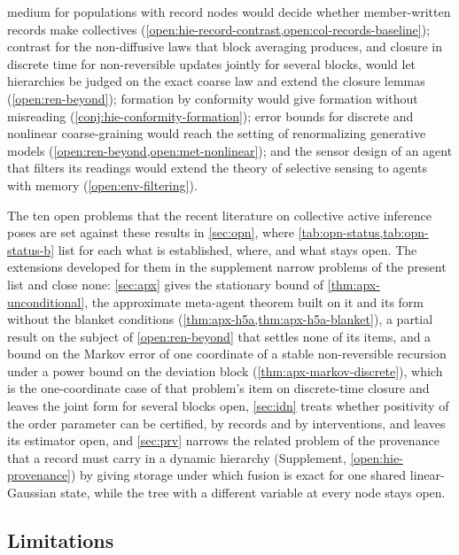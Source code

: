 medium for populations with record nodes would decide whether member-written records make collectives (\cref{open:hie-record-contrast,open:col-records-baseline}); contrast for the non-diffusive laws that block averaging produces, and closure in discrete time for non-reversible updates jointly for several blocks, would let hierarchies be judged on the exact coarse law and extend the closure lemmas (\cref{open:ren-beyond}); formation by conformity would give formation without misreading (\cref{conj:hie-conformity-formation}); error bounds for discrete and nonlinear coarse-graining would reach the setting of renormalizing generative models (\cref{open:ren-beyond,open:met-nonlinear}); and the sensor design of an agent that filters its readings would extend the theory of selective sensing to agents with memory (\cref{open:env-filtering}).

The ten open problems that the recent literature on collective active inference poses are set against these results in \cref{sec:opn}, where \cref{tab:opn-status,tab:opn-status-b} list for each what is established, where, and what stays open. The extensions developed for them in the supplement narrow problems of the present list and close none: \cref{sec:apx} gives the stationary bound of \cref{thm:apx-unconditional}, the approximate meta-agent theorem built on it and its form without the blanket conditions (\cref{thm:apx-h5a,thm:apx-h5a-blanket}), a partial result on the subject of \cref{open:ren-beyond} that settles none of its items, and a bound on the Markov error of one coordinate of a stable non-reversible recursion under a power bound on the deviation block (\cref{thm:apx-markov-discrete}), which is the one-coordinate case of that problem's item on discrete-time closure and leaves the joint form for several blocks open, \cref{sec:idn} treats whether positivity of the order parameter can be certified, by records and by interventions, and leaves its estimator open, and \cref{sec:prv} narrows the related problem of the provenance that a record must carry in a dynamic hierarchy (Supplement, \cref{open:hie-provenance}) by giving storage under which fusion is exact for one shared linear-Gaussian state, while the tree with a different variable at every node stays open.

\subsection{Limitations}\label{sec:dis-limits}

